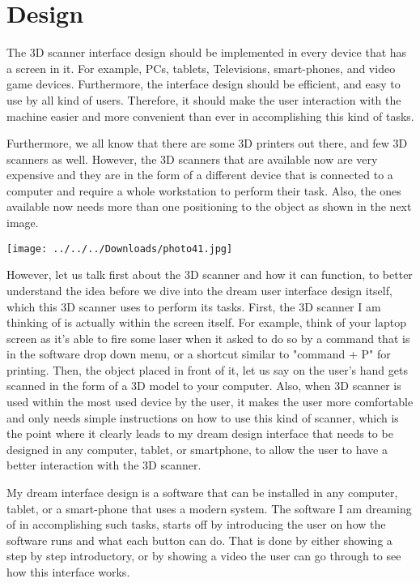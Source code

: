 \documentclass[12pt, oneside]{amsart}   	%
\begin{document}
\section{Design}
The 3D scanner interface design should be implemented in every device that has a screen in it.  For example, PCs, tablets, Televisions, smart-phones, and video game devices. Furthermore, the interface design should be efficient, and easy to use by all kind of users. Therefore, it should make the user interaction with the machine easier and more convenient than ever in accomplishing this kind of tasks. 

Furthermore, we all know that there are some 3D printers out there, and few 3D scanners as well.  However, the 3D scanners that are available now are very expensive and they are in the form of a different device that is connected to a computer and require a whole workstation to perform their task.  Also, the ones available now needs more than one positioning to the object as shown in the next image.\cite{First}

\texttt{[image: ../../../Downloads/photo41.jpg]}

However, let us talk first about the 3D scanner and how it can function, to better understand the idea before we dive into the dream user interface design itself, which this 3D scanner uses to perform its tasks.
First, the 3D scanner I am thinking of is actually within the screen itself.  For example, think of your laptop screen as it's able to fire some laser when it asked to do so by a command that is in the software drop down menu, or a shortcut similar to "command + P" for printing. Then, the object placed in front of it, let us say on the user's hand gets scanned in the form of a 3D model to your computer.  Also, when 3D scanner is used within the most used device by the user, it makes the user more comfortable and only needs simple instructions on how to use this kind of scanner, which is the point where it clearly leads to my dream design interface that needs to be designed in any computer, tablet, or smartphone, to allow the user to have a better interaction with the 3D scanner.

My dream interface design is a software that can be installed in any computer, tablet, or a smart-phone that uses a modern system.  The software I am dreaming of in accomplishing such tasks, starts off by introducing the user on how the software runs and what each button can do.  That is done by either showing a step by step introductory, or by showing a video the user can go through to see how this interface works.  
\end{document}
